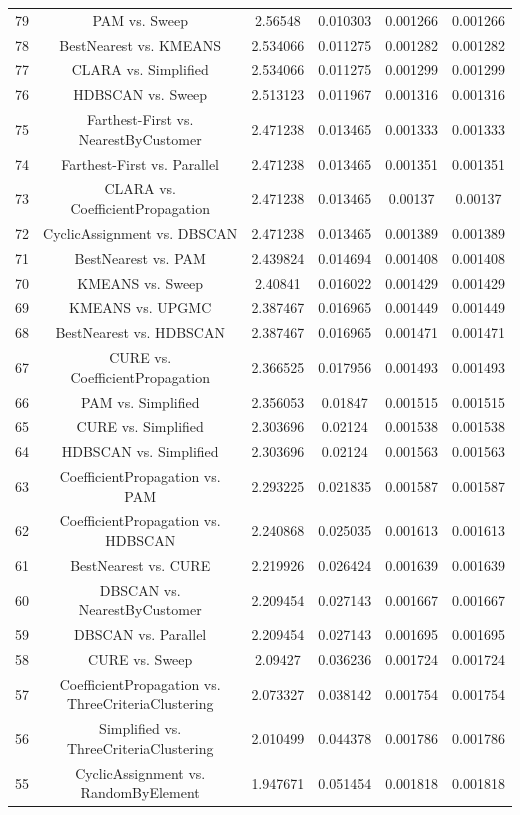 \documentclass[a4paper,10pt]{article}
\begin{document}
\begin{landscape}
\begin{table}[!htp]
\begin{tabular}{cccccc}
79&PAM vs. Sweep&2.56548&0.010303&0.001266&0.001266\\
78&BestNearest vs. KMEANS&2.534066&0.011275&0.001282&0.001282\\
77&CLARA vs. Simplified&2.534066&0.011275&0.001299&0.001299\\
76&HDBSCAN vs. Sweep&2.513123&0.011967&0.001316&0.001316\\
75&Farthest-First vs. NearestByCustomer&2.471238&0.013465&0.001333&0.001333\\
74&Farthest-First vs. Parallel&2.471238&0.013465&0.001351&0.001351\\
73&CLARA vs. CoefficientPropagation&2.471238&0.013465&0.00137&0.00137\\
72&CyclicAssignment vs. DBSCAN&2.471238&0.013465&0.001389&0.001389\\
71&BestNearest vs. PAM&2.439824&0.014694&0.001408&0.001408\\
70&KMEANS vs. Sweep&2.40841&0.016022&0.001429&0.001429\\
69&KMEANS vs. UPGMC&2.387467&0.016965&0.001449&0.001449\\
68&BestNearest vs. HDBSCAN&2.387467&0.016965&0.001471&0.001471\\
67&CURE vs. CoefficientPropagation&2.366525&0.017956&0.001493&0.001493\\
66&PAM vs. Simplified&2.356053&0.01847&0.001515&0.001515\\
65&CURE vs. Simplified&2.303696&0.02124&0.001538&0.001538\\
64&HDBSCAN vs. Simplified&2.303696&0.02124&0.001563&0.001563\\
63&CoefficientPropagation vs. PAM&2.293225&0.021835&0.001587&0.001587\\
62&CoefficientPropagation vs. HDBSCAN&2.240868&0.025035&0.001613&0.001613\\
61&BestNearest vs. CURE&2.219926&0.026424&0.001639&0.001639\\
60&DBSCAN vs. NearestByCustomer&2.209454&0.027143&0.001667&0.001667\\
59&DBSCAN vs. Parallel&2.209454&0.027143&0.001695&0.001695\\
58&CURE vs. Sweep&2.09427&0.036236&0.001724&0.001724\\
57&CoefficientPropagation vs. ThreeCriteriaClustering&2.073327&0.038142&0.001754&0.001754\\
56&Simplified vs. ThreeCriteriaClustering&2.010499&0.044378&0.001786&0.001786\\
55&CyclicAssignment vs. RandomByElement&1.947671&0.051454&0.001818&0.001818\\

\end{tabular}
\end{table}
\end{landscape}
\end{document}
